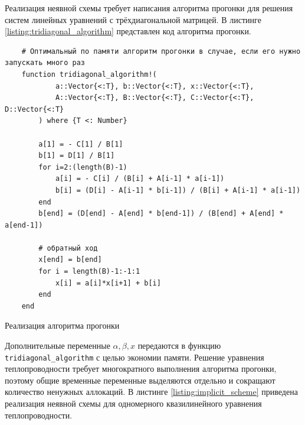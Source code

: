 Реализация неявной схемы требует написания алгоритма прогонки для решения систем линейных уравнений с трёхдиагональной матрицей.
В листинге \ref{listing:tridiagonal_algorithm} представлен код алгоритма прогонки.
\begin{listing}
    \begin{verbatim}
    # Оптимальный по памяти алгоритм прогонки в случае, если его нужно запускать много раз
    function tridiagonal_algorithm!(
            a::Vector{<:T}, b::Vector{<:T}, x::Vector{<:T},
            A::Vector{<:T}, B::Vector{<:T}, C::Vector{<:T}, D::Vector{<:T}
        ) where {T <: Number}
    
        a[1] = - C[1] / B[1]
        b[1] = D[1] / B[1]
        for i=2:(length(B)-1)
            a[i] = - C[i] / (B[i] + A[i-1] * a[i-1])
            b[i] = (D[i] - A[i-1] * b[i-1]) / (B[i] + A[i-1] * a[i-1])
        end
        b[end] = (D[end] - A[end] * b[end-1]) / (B[end] + A[end] * a[end-1])
    
        # обратный ход
        x[end] = b[end]
        for i = length(B)-1:-1:1
            x[i] = a[i]*x[i+1] + b[i]
        end
    end
    \end{verbatim}
    \caption{Реализация алгоритма прогонки}
    \label{listing:tridiagonal_algorithm}
\end{listing}
Дополнительные переменные $\alpha, \beta, x$ передаются в функцию \texttt{tridiagonal\_algorithm} с целью экономии памяти.
Решение уравнения теплопроводности требует многократного выполнения алгоритма прогонки, поэтому общие временные переменные выделяются отдельно и сокращают количество ненужных аллокаций.
В листинге \ref{listing:implicit_scheme} приведена реализация неявной схемы для одномерного квазилинейного уравнения теплопроводности.
